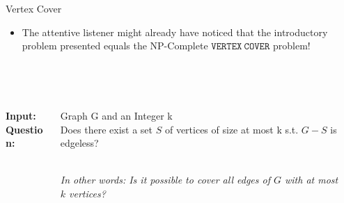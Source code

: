 \begin{frame}[c]{Vertex Cover}
\begin{itemize}
    \item The attentive listener might already have noticed that the introductory problem presented equals the NP-Complete $\mathtt{VERTEX~COVER}$ problem!
\end{itemize}

\begin{tcolorbox}[colback=green!5,colframe=green!40!black,title=$\mathtt{MIN~VERTEX~COVER}$ (\cite{Cygan2015})]
\begin{columns}[T] %
    \begin{column}{.18\textwidth}
    \\~
    
    \textbf{Input:}\\
    \textbf{Question:}
    \end{column}
    \begin{column}{.78\textwidth}
    \\~
    
    Graph G and an Integer k\\
    Does there exist a set $S$ of vertices of size at most k s.t. $G - S$ is edgeless?
    \\~
    
   \textit{In other words: Is it possible to cover all edges of $G$ with at most $k$ vertices?}
    \end{column}
 \begin{center}
 \end{center}
 \end{columns}
\end{tcolorbox}
\end{frame}

